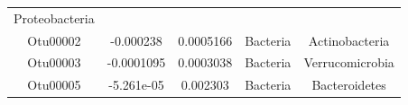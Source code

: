 \documentclass[]{article}
\begin{document}
\begin{longtable}[]{@{}ccccc@{}}
\begin{minipage}[t]{0.20\columnwidth}
Proteobacteria\strut
\end{minipage}\tabularnewline
\begin{minipage}[t]{0.13\columnwidth}\centering\strut
Otu00002\strut
\end{minipage} & \begin{minipage}[t]{0.16\columnwidth}\centering\strut
-0.000238\strut
\end{minipage} & \begin{minipage}[t]{0.14\columnwidth}\centering\strut
0.0005166\strut
\end{minipage} & \begin{minipage}[t]{0.13\columnwidth}\centering\strut
Bacteria\strut
\end{minipage} & \begin{minipage}[t]{0.20\columnwidth}\centering\strut
Actinobacteria\strut
\end{minipage}\tabularnewline
\begin{minipage}[t]{0.13\columnwidth}\centering\strut
Otu00003\strut
\end{minipage} & \begin{minipage}[t]{0.16\columnwidth}\centering\strut
-0.0001095\strut
\end{minipage} & \begin{minipage}[t]{0.14\columnwidth}\centering\strut
0.0003038\strut
\end{minipage} & \begin{minipage}[t]{0.13\columnwidth}\centering\strut
Bacteria\strut
\end{minipage} & \begin{minipage}[t]{0.20\columnwidth}\centering\strut
Verrucomicrobia\strut
\end{minipage}\tabularnewline
\begin{minipage}[t]{0.13\columnwidth}\centering\strut
Otu00005\strut
\end{minipage} & \begin{minipage}[t]{0.16\columnwidth}\centering\strut
-5.261e-05\strut
\end{minipage} & \begin{minipage}[t]{0.14\columnwidth}\centering\strut
0.002303\strut
\end{minipage} & \begin{minipage}[t]{0.13\columnwidth}\centering\strut
Bacteria\strut
\end{minipage} & \begin{minipage}[t]{0.20\columnwidth}\centering\strut
Bacteroidetes\strut
\end{minipage}\tabularnewline

\end{longtable}
\end{document}
